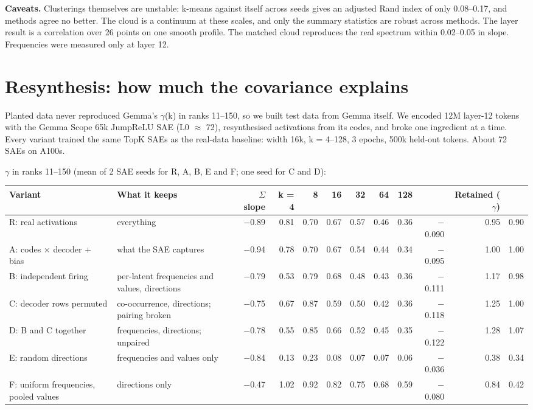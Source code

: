 \documentclass[11pt]{article}
\begin{document}
\textbf{Caveats.} Clusterings themselves are unstable: k-means against itself across seeds gives an adjusted Rand index of only 0.08--0.17, and methods agree no better. The cloud is a continuum at these scales, and only the summary statistics are robust across methods. The layer result is a correlation over 26 points on one smooth profile. The matched cloud reproduces the real spectrum within 0.02--0.05 in slope. Frequencies were measured only at layer 12.

\section{Resynthesis: how much the covariance explains}

Planted data never reproduced Gemma's $\gamma$(k) in ranks 11--150, so we built test data from Gemma itself. We encoded 12M layer-12 tokens with the Gemma Scope 65k JumpReLU SAE (L0 $\approx$ 72), resynthesised activations from its codes, and broke one ingredient at a time. Every variant trained the same TopK SAEs as the real-data baseline: width 16k, k = 4--128, 3 epochs, 500k held-out tokens. About 72 SAEs on A100s.

$\gamma$ in ranks 11--150 (mean of 2 SAE seeds for R, A, B, E and F; one seed for C and D):

{\scriptsize\setlength{\tabcolsep}{2.5pt}
\begin{xltabular}{\textwidth}{>{\raggedright\arraybackslash}X>{\raggedright\arraybackslash}Xrrrrrrrrrr}
\toprule
\textbf{Variant} & \textbf{What it keeps} & \textbf{$\Sigma$ slope} & \textbf{k = 4} & \textbf{8} & \textbf{16} & \textbf{32} & \textbf{64} & \textbf{128} & \textbf{} & \textbf{Retained ($\gamma$)} & \textbf{} \\
\midrule
\endhead
\bottomrule
\endlastfoot
R: real activations & everything & $-$0.89 & 0.81 & 0.70 & 0.67 & 0.57 & 0.46 & 0.36 & $-$0.090 & 0.95 & 0.90 \\
A: codes $\times$ decoder + bias & what the SAE captures & $-$0.94 & 0.78 & 0.70 & 0.67 & 0.54 & 0.44 & 0.34 & $-$0.095 & 1.00 & 1.00 \\
B: independent firing & per-latent frequencies and values, directions & $-$0.79 & 0.53 & 0.79 & 0.68 & 0.48 & 0.43 & 0.36 & $-$0.111 & 1.17 & 0.98 \\
C: decoder rows permuted & co-occurrence, directions; pairing broken & $-$0.75 & 0.67 & 0.87 & 0.59 & 0.50 & 0.42 & 0.36 & $-$0.118 & 1.25 & 1.00 \\
D: B and C together & frequencies, directions; unpaired & $-$0.78 & 0.55 & 0.85 & 0.66 & 0.52 & 0.45 & 0.35 & $-$0.122 & 1.28 & 1.07 \\
E: random directions & frequencies and values only & $-$0.84 & 0.13 & 0.23 & 0.08 & 0.07 & 0.07 & 0.06 & $-$0.036 & 0.38 & 0.34 \\
F: uniform frequencies, pooled values & directions only & $-$0.47 & 1.02 & 0.92 & 0.82 & 0.75 & 0.68 & 0.59 & $-$0.080 & 0.84 & 0.42 \\
\end{xltabular}}
\end{document}
